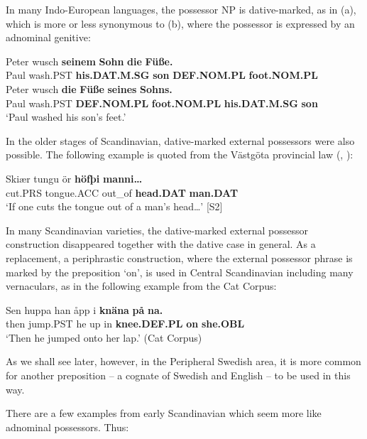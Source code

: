 In many Indo-European languages, the possessor NP is dative-marked, as in (a), which is more or less synonymous to (b), where the possessor is expressed by an adnominal genitive:

\ea\label{}
\ea 
\gll Peter  wusch  \textbf{seinem} \textbf{Sohn} \textbf{die} \textbf{Füße.}\\
Paul  wash.PST  \textbf{his.DAT.M.SG} \textbf{son} \textbf{DEF.NOM.PL} \textbf{foot.NOM.PL}\\
\ex 
\gll Peter  wusch  \textbf{die} \textbf{Füße} \textbf{seines} \textbf{Sohns.}\\
Paul  wash.PST  \textbf{DEF.NOM.PL} \textbf{foot.NOM.PL} \textbf{his.DAT.M.SG} \textbf{son}\\
\glt ‘Paul washed his son’s feet.’
\z
\z 

In the older stages of Scandinavian, dative-marked external possessors were also possible. The following example is quoted from the Västgöta provincial law (\citet[15]{Wessén1956}, \citet[212]{Norde1997}): 

\ea\label{}
\gll Skiær  tungu  ör  \textbf{höfþi} \textbf{manni…}\\
cut.PRS  tongue.ACC  out\_of  \textbf{head.DAT} \textbf{man.DAT}\\
\glt ‘If one cuts the tongue out of a man’s head…’ [S2]
\z

In many Scandinavian varieties, the dative-marked external possessor construction disappeared together with the dative case in general. As a replacement, a periphrastic construction, where the external possessor phrase is marked by the preposition  ‘on’, is used in Central Scandinavian including many vernaculars, as in the following example from the Cat Corpus: 

\ea\label{}
\gll Sen  huppa  han  åpp  i  \textbf{knäna} \textbf{på} \textbf{na.}\\
then  jump.PST  he  up  in  \textbf{knee.DEF.PL} \textbf{on} \textbf{she.OBL}\\
\glt ‘Then he jumped onto her lap.’ (Cat Corpus)
\z

As we shall see later, however, in the Peripheral Swedish area, it is more common for another preposition – a cognate of Swedish  and English  – to be used in this way.

There are a few examples from early Scandinavian which seem more like adnominal possessors. Thus:

